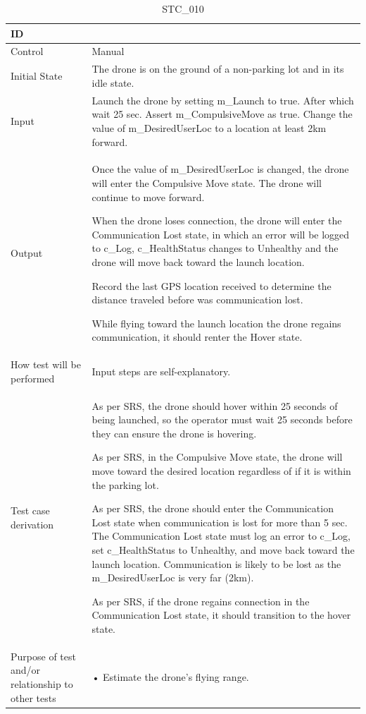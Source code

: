 \documentclass[12pt, titlepage]{article}
\begin{document}
\begin{table}[!h]
\begin{center}
\caption {STC\_010}
\label{tab:STC_010}
\begin{tabular}{ | m{3.2cm} | m{12.2cm} | } 
\hline
ID & \nameref{tab:STC_010} \\ 
\hline
Control & Manual \\ 
\hline
Initial State & The drone is on the ground of a non-parking lot and in its idle state. \\ 
\hline
Input & Launch the drone by setting m_Launch to true. After which wait 25 sec.  Assert m_CompulsiveMove as true. Change the value of m_DesiredUserLoc to a location at least 2km forward. \\ 
\hline
Output & Once the value of m_DesiredUserLoc is changed, the drone will enter the Compulsive Move state. The drone will continue to move forward. 

When the drone loses connection, the drone will enter the Communication Lost state, in which an error will be logged to c_Log, c_HealthStatus changes to Unhealthy and the drone will move back toward the launch location. 

Record the last GPS location received to determine the distance traveled before was communication lost. 

While flying toward the launch location the drone regains communication, it should renter the Hover state. \\ 
\hline
How test will be performed & Input steps are self-explanatory. \\ 
\hline
Test case derivation & As per SRS, the drone should hover within 25 seconds of being launched, so the operator must wait 25 seconds before they can ensure the drone is hovering. 

As per SRS, in the Compulsive Move state, the drone will move toward the desired location regardless of if it is within the parking lot.

As per SRS, the drone should enter the Communication Lost state when communication is lost for more than 5 sec. The Communication Lost state must log an error to c_Log, set c_HealthStatus to Unhealthy, and move back toward the launch location. Communication is likely to be lost as the m_DesiredUserLoc is very far (2km).

As per SRS, if the drone regains connection in the Communication Lost state, it should transition to the hover state.
 \\ 
\hline
Purpose of test and/or relationship to other tests & • Estimate the drone's flying range.


\end{tabular}
\end{center}
\end{table}
\end{document}
